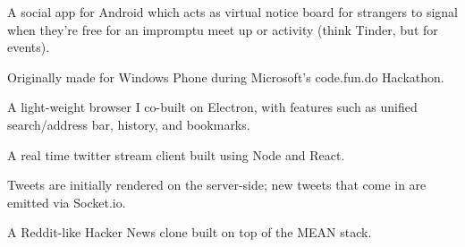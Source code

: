 \documentclass[a4paper]{resume}
\begin{document}
\begin{minipage}[t]{0.66\textwidth}

\begin{tightitemize}
\item A social app for Android which acts as virtual notice board for strangers to signal when
they’re free for an impromptu meet up or activity (think Tinder, but for events).
\item Originally made for Windows Phone during Microsoft’s code.fun.do Hackathon.
\end{tightitemize}

\sectionspace %




\begin{tightitemize}
\item A light-weight browser I co-built on Electron, with features such as unified search/address bar, history, and bookmarks.
\end{tightitemize}

\sectionspace %




\begin{tightitemize}
\item A real time twitter stream client built using Node and React.
\item Tweets are initially rendered on the server-side; new tweets that come in are emitted via Socket.io.
\end{tightitemize}

\sectionspace %




\begin{tightitemize}
\item A Reddit-like Hacker News clone built on top of the MEAN stack.
\end{tightitemize}


\end{minipage}
\end{document}
